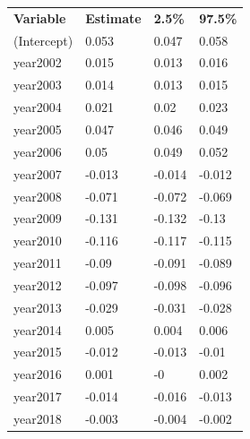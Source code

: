 \documentclass{article}
\begin{document}
\begin{table}[]
\begin{tabular}{llll}
\textbf{Variable}                 & \textbf{Estimate} & \textbf{2.5\%} & \textbf{97.5\%} \\
(Intercept)                       & 0.053             & 0.047          & 0.058           \\
year2002                          & 0.015             & 0.013          & 0.016           \\
year2003                          & 0.014             & 0.013          & 0.015           \\
year2004                          & 0.021             & 0.02           & 0.023           \\
year2005                          & 0.047             & 0.046          & 0.049           \\
year2006                          & 0.05              & 0.049          & 0.052           \\
year2007                          & -0.013            & -0.014         & -0.012          \\
year2008                          & -0.071            & -0.072         & -0.069          \\
year2009                          & -0.131            & -0.132         & -0.13           \\
year2010                          & -0.116            & -0.117         & -0.115          \\
year2011                          & -0.09             & -0.091         & -0.089          \\
year2012                          & -0.097            & -0.098         & -0.096          \\
year2013                          & -0.029            & -0.031         & -0.028          \\
year2014                          & 0.005             & 0.004          & 0.006           \\
year2015                          & -0.012            & -0.013         & -0.01           \\
year2016                          & 0.001             & -0             & 0.002           \\
year2017                          & -0.014            & -0.016         & -0.013          \\
year2018                          & -0.003            & -0.004         & -0.002          \\

\end{tabular}
\end{table}
\end{document}
